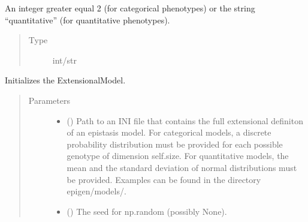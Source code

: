 \documentclass[a4paper,10pt,english]{sphinxhowto}
\begin{document}
\begin{fulllineitems}
\begin{fulllineitems}
\begin{quote}
\begin{description}
\end{description}\end{quote}

\end{fulllineitems}


\begin{fulllineitems}
\label{\detokenize{utils:utils.extensional_model.ExtensionalModel.phenotype}}
An integer greater equal 2 (for categorical phenotypes)
or the string “quantitative” (for quantitative phenotypes).
\begin{quote}\begin{description}
\item[{Type}] \leavevmode
int/str

\end{description}\end{quote}

\end{fulllineitems}


\begin{fulllineitems}
\label{\detokenize{utils:utils.extensional_model.ExtensionalModel.__init__}}
Initializes the ExtensionalModel.
\begin{quote}\begin{description}
\item[{Parameters}] \leavevmode\begin{itemize}
\item {} 
 () \textendash{} Path to an INI file that contains the full extensional definiton of an epistasis model.
For categorical models, a discrete probability distribution must be provided for each possible genotype of dimension self.size.
For quantitative models, the mean and the standard deviation of normal distributions must be provided.
Examples can be found in the directory epigen/models/.

\item {} 
 () \textendash{} The seed for np.random (possibly None).

\end{itemize}

\end{description}\end{quote}

\end{fulllineitems}


\end{fulllineitems}
\end{document}
